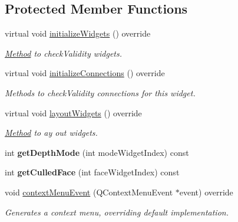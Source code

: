 \subsection*{Protected Member Functions}
\begin{DoxyCompactItemize}
\item 
\mbox{\label{classrev_1_1_view_1_1_render_settings_widget_a95938e4f5b225d8519923a5ee5c33fd6}} 
virtual void \mbox{\hyperlink{classrev_1_1_view_1_1_render_settings_widget_a95938e4f5b225d8519923a5ee5c33fd6}{initialize\+Widgets}} () override
\begin{DoxyCompactList}\small\item\em \mbox{\hyperlink{struct_method}{Method}} to check\+Validity widgets. \end{DoxyCompactList}\item 
\mbox{\label{classrev_1_1_view_1_1_render_settings_widget_a890b1c5457a60f7f5c406563c713efdb}} 
virtual void \mbox{\hyperlink{classrev_1_1_view_1_1_render_settings_widget_a890b1c5457a60f7f5c406563c713efdb}{initialize\+Connections}} () override
\begin{DoxyCompactList}\small\item\em Methods to check\+Validity connections for this widget. \end{DoxyCompactList}\item 
\mbox{\label{classrev_1_1_view_1_1_render_settings_widget_a359b86008952aadc2ff6a71c8be484cb}} 
virtual void \mbox{\hyperlink{classrev_1_1_view_1_1_render_settings_widget_a359b86008952aadc2ff6a71c8be484cb}{layout\+Widgets}} () override
\begin{DoxyCompactList}\small\item\em \mbox{\hyperlink{struct_method}{Method}} to ay out widgets. \end{DoxyCompactList}\item 
\mbox{\label{classrev_1_1_view_1_1_render_settings_widget_a2acad438de0e25c441042761b958828b}} 
int {\bfseries get\+Depth\+Mode} (int mode\+Widget\+Index) const
\item 
\mbox{\label{classrev_1_1_view_1_1_render_settings_widget_ace83fafe6b2126e3100a6d55d738040c}} 
int {\bfseries get\+Culled\+Face} (int face\+Widget\+Index) const
\item 
void \mbox{\hyperlink{classrev_1_1_view_1_1_render_settings_widget_a3b4cb80743160e4e88a4c68ad041906d}{context\+Menu\+Event}} (Q\+Context\+Menu\+Event $\ast$event) override
\begin{DoxyCompactList}\small\item\em Generates a context menu, overriding default implementation. \end{DoxyCompactList}\end{DoxyCompactItemize}
